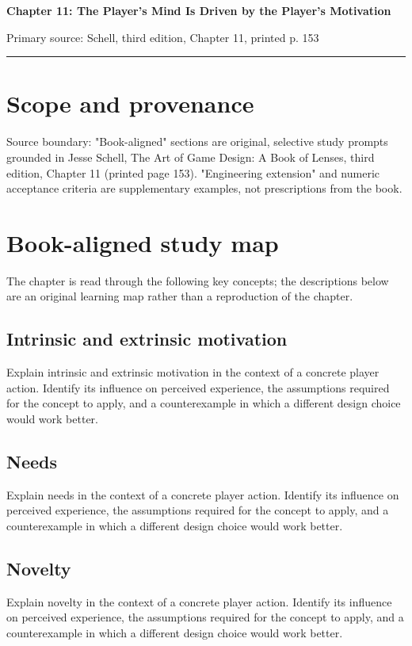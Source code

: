 \documentclass[11pt]{article}
\begin{document}
{\huge\bfseries\color{suiteblue} Chapter 11: The Player's Mind Is Driven by the Player's Motivation}\par
\vspace{0.15in}
{\normalsize\color{suitegray} Primary source: Schell, third edition, Chapter 11, printed p. 153}\par
\vspace{0.15in}\hrule\vspace{0.15in}

\section{Scope and provenance}
Source boundary: "Book-aligned" sections are original, selective study prompts grounded in Jesse Schell, The Art of Game Design: A Book of Lenses, third edition, Chapter 11 (printed page 153). "Engineering extension" and numeric acceptance criteria are supplementary examples, not prescriptions from the book.


\section{Book-aligned study map}
The chapter is read through the following key concepts; the descriptions below are an original learning map rather than a reproduction of the chapter.


\subsection{Intrinsic and extrinsic motivation}
Explain intrinsic and extrinsic motivation in the context of a concrete player action. Identify its influence on perceived experience, the assumptions required for the concept to apply, and a counterexample in which a different design choice would work better.


\subsection{Needs}
Explain needs in the context of a concrete player action. Identify its influence on perceived experience, the assumptions required for the concept to apply, and a counterexample in which a different design choice would work better.


\subsection{Novelty}
Explain novelty in the context of a concrete player action. Identify its influence on perceived experience, the assumptions required for the concept to apply, and a counterexample in which a different design choice would work better.
\end{document}
